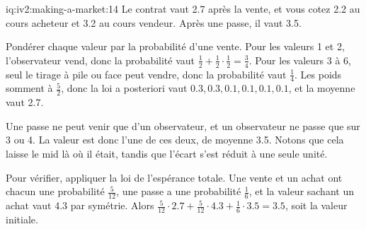 \begin{solution}{iq:iv2:making-a-market:14}
Le contrat vaut 2.7 après la vente, et vous cotez 2.2 au cours acheteur et 3.2 au cours vendeur. Après une passe, il vaut 3.5.

Pondérer chaque valeur par la probabilité d'une vente. Pour les valeurs 1 et 2, l'observateur vend, donc la probabilité vaut $\tfrac12 + \tfrac12 \cdot \tfrac12 = \tfrac34$. Pour les valeurs 3 à 6, seul le tirage à pile ou face peut vendre, donc la probabilité vaut $\tfrac14$. Les poids somment à $\tfrac52$, donc la loi a posteriori vaut $0.3, 0.3, 0.1, 0.1, 0.1, 0.1$, et la moyenne vaut 2.7.

Une passe ne peut venir que d'un observateur, et un observateur ne passe que sur 3 ou 4. La valeur est donc l'une de ces deux, de moyenne 3.5. Notons que cela laisse le mid là où il était, tandis que l'écart s'est réduit à une seule unité.

Pour vérifier, appliquer la loi de l'espérance totale. Une vente et un achat ont chacun une probabilité $\tfrac{5}{12}$, une passe a une probabilité $\tfrac16$, et la valeur sachant un achat vaut 4.3 par symétrie. Alors $\tfrac{5}{12} \cdot 2.7 + \tfrac{5}{12} \cdot 4.3 + \tfrac16 \cdot 3.5 = 3.5$, soit la valeur initiale.

\end{solution}

